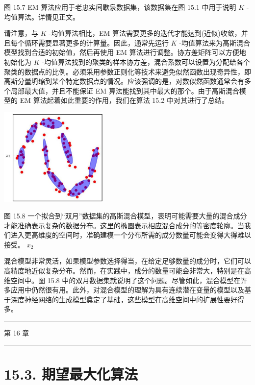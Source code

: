\documentclass[10pt]{report}
\newcommand{\HRule}{\begin{center}\rule{0.9\linewidth}{0.2mm}\end{center}}
\begin{document}
图 15.7 EM 算法应用于老忠实间歇泉数据集，该数据集在图 15.1 中用于说明 \(K\) -均值算法。详情见正文。

请注意，与 \(K\) -均值算法相比，EM 算法需要更多的迭代才能达到(近似)收敛，并且每个循环需要显著更多的计算量。因此，通常先运行 \(K\) -均值算法来为高斯混合模型找到合适的初始值，然后再使用 EM 算法进行调整。协方差矩阵可以方便地初始化为 \(K\) -均值算法找到的聚类的样本协方差，混合系数可以设置为分配给各个聚类的数据点的比例。必须采用参数正则化等技术来避免似然函数出现奇异性，即高斯分量坍缩到某个特定数据点的情况。应该强调的是，对数似然函数通常会有多个局部最大值，并且不能保证 EM 算法能找到其中最大的那个。由于高斯混合模型的 EM 算法起着如此重要的作用，我们在算法 15.2 中对其进行了总结。

\begin{center}
\includegraphics[max width=0.4\textwidth]{images/0194e279-9b28-703a-88f4-c3ac21e2010d_493_950_344_602_548_0.jpg}
\end{center}
\hspace*{3em} 

图 15.8 一个拟合到“双月”数据集的高斯混合模型，表明可能需要大量的混合成分才能准确表示复杂的数据分布。这里的椭圆表示相应混合成分的等密度轮廓。当我们进入更高维度的空间时，准确建模一个分布所需的成分数量可能会变得大得难以接受。 \({x}_{2}\)

混合模型非常灵活，如果模型参数选择得当，在给定足够数量的成分时，它们可以高精度地近似复杂分布。然而，在实践中，成分的数量可能会非常大，特别是在高维空间中。图 15.8 中的双月数据集就说明了这个问题。尽管如此，混合模型在许多应用中仍然很有用。此外，对混合模型的理解为具有连续潜在变量的模型以及基于深度神经网络的生成模型奠定了基础，这些模型在高维空间中的扩展性要好得多。

\HRule

第 16 章

\HRule

\section*{15.3. 期望最大化算法}
\end{document}
